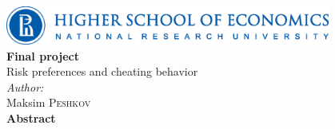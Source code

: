 \documentclass[12pt]{article}
\begin{document}
	
	\begin{titlepage} %
		\newcommand{\HRule}{\rule{\linewidth}{0.5mm}} %
		
		\begin{center}
			

		
		
		
		
		\includegraphics[width=0.8\textwidth]{logo_hse.eps}\\[4cm] %
		
		
		
		
		
		
		{\large \bfseries Final project}\\[1cm]

		
		{\LARGE  Risk preferences and cheating behavior}\\[0.5cm]
		

		


		
		
	
			\textit{Author:}\\
			Maksim \textsc{Peshkov} \\[2cm]

	
		
		
		\textbf{Abstract}

		\end{center}


\end{titlepage}
\end{document}
